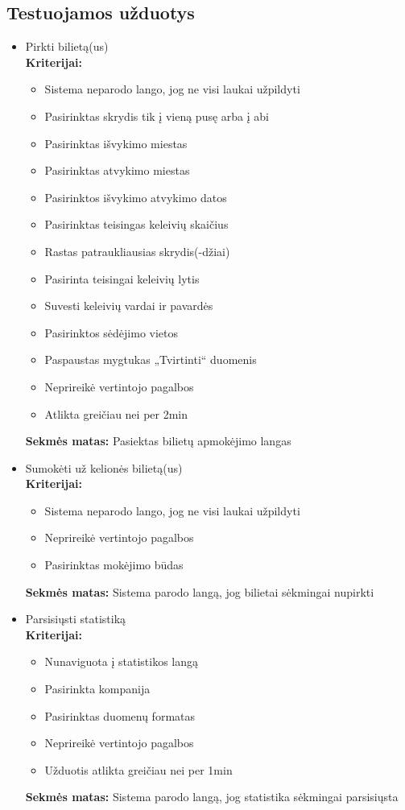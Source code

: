 \documentclass{VUMIFPSkursinis}
\begin{document}
\subsection{Testuojamos užduotys}
\begin{itemize}
\item Pirkti bilietą(us) \\
	\textbf{Kriterijai:}
	\begin{itemize}
	\item Sistema neparodo lango, jog ne visi laukai užpildyti
	\item Pasirinktas skrydis tik į vieną pusę arba į abi
	\item Pasirinktas išvykimo miestas
	\item Pasirinktas atvykimo miestas
	\item Pasirinktos išvykimo atvykimo datos
	\item Pasirinktas teisingas keleivių skaičius
	\item Rastas patraukliausias skrydis(-džiai)
	\item Pasirinta teisingai keleivių lytis
	\item Suvesti keleivių vardai ir pavardės
	\item Pasirinktos sėdėjimo vietos
	\item Paspaustas mygtukas „Tvirtinti“ duomenis
	\item Neprireikė vertintojo pagalbos
	\item Atlikta greičiau nei per 2min
	\end{itemize}
	\textbf{Sekmės matas:} Pasiektas bilietų apmokėjimo langas \\

\item Sumokėti už kelionės bilietą(us)  \\
	\textbf{Kriterijai:}
	\begin{itemize}
	\item Sistema neparodo lango, jog ne visi laukai užpildyti
	\item Neprireikė vertintojo pagalbos
	\item Pasirinktas mokėjimo būdas
	\end{itemize}
	\textbf{Sekmės matas:} Sistema parodo langą, jog bilietai sėkmingai nupirkti \\

\item Parsisiųsti statistiką  \\
	\textbf{Kriterijai:}
	\begin{itemize}
	\item Nunaviguota į statistikos langą
	\item Pasirinkta kompanija
	\item Pasirinktas duomenų formatas
	\item Neprireikė vertintojo pagalbos
	\item Užduotis atlikta greičiau nei per 1min
	\end{itemize}
	\textbf{Sekmės matas:} Sistema parodo langą, jog statistika sėkmingai parsisiųsta \\


\end{itemize}
\end{document}

